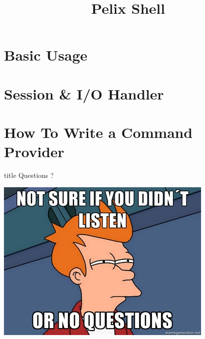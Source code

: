 \documentclass[table]{beamer}
\title[Pelix Shell]{Pelix Shell}
\begin{document}
\frame{\titlepage}

\section{Basic Usage}


\section{Session \& I/O Handler}


\section{How To Write a Command Provider}


\begin{frame}
  \vfill
  \centering
  \begin{beamercolorbox}[sep=8pt,center,shadow=true,rounded=true]{title}
    Questions ?\par%
  \end{beamercolorbox}
  \vspace{3ex}
  \includegraphics[width=.5\textwidth]{../imgs/questions_fry}
  \vfill
\end{frame}
\end{document}
